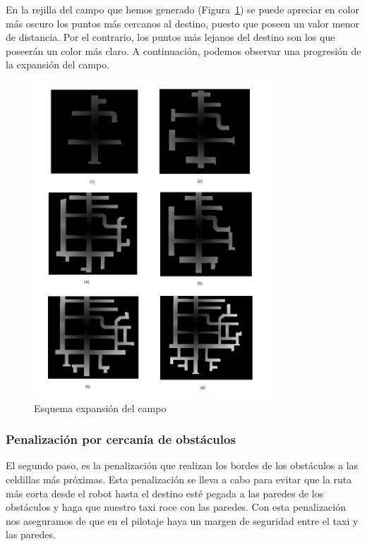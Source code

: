 En la rejilla del campo que hemos generado (Figura~\ref{fig.expansiones_gpp}) se puede apreciar en color más oscuro los puntos más cercanos al destino, puesto que poseen un valor menor de distancia. Por el contrario, los puntos más lejanos del destino son los que poseerán un color más claro. A continuación, podemos observar una progresión de la expansión del campo.\\

\begin{figure}[H]
  \begin{center}
    \includegraphics[width=0.8\textwidth]{figures/GPP/expansiones.png}
		\caption{Esquema expansión del campo}
		\label{fig.expansiones_gpp}
		\end{center}
\end{figure}

\subsubsection{Penalización por cercanía de obstáculos}
El segundo paso, es la penalización que realizan los bordes de los obstáculos a las celdillas más próximas. Esta penalización se lleva a cabo para evitar que la ruta más corta desde el robot hasta el destino esté pegada a las paredes de los obstáculos y haga que nuestro taxi roce con las paredes. Con esta penalización nos aseguramos de que en el pilotaje haya un margen de seguridad entre el taxi y las paredes.\\

